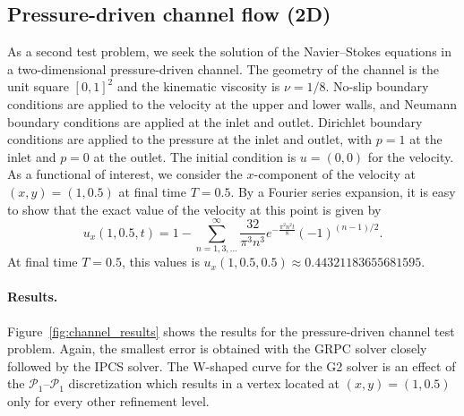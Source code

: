 \subsection{Pressure-driven channel flow (2D)}

As a second test problem, we seek the solution of the Navier--Stokes
equations in a two-dimensional pressure-driven channel. The geometry
of the channel is the unit square $[0, 1]^2$ and the kinematic
viscosity is $\nu = 1/8$. No-slip boundary conditions are applied to
the velocity at the upper and lower walls, and Neumann boundary
conditions are applied at the inlet and outlet. Dirichlet boundary
conditions are applied to the pressure at the inlet and outlet, with
$p = 1$ at the inlet and $p = 0$ at the outlet. The initial condition
is $u = (0, 0)$ for the velocity. As a functional of interest, we
consider the $x$-component of the velocity at $(x, y) = (1, 0.5)$ at
final time $T = 0.5$. By a Fourier series expansion, it is easy to
show that the exact value of the velocity at this point is given by
\begin{equation} \label{eq:exact_channel}
  u_x(1, 0.5, t) = 1 - \sum_{n=1,3,...}^\infty \frac{32}{\pi^3 n^3}
  e^{-\frac{\pi^2 n^2 t}{8}} (-1)^{(n-1)/2}.
\end{equation}
At final time $T=0.5$, this values is $u_x(1, 0.5, 0.5) \approx
0.44321183655681595$.

\paragraph{Results.}

Figure~\ref{fig:channel_results} shows the results for the
pressure-driven channel test problem. Again, the smallest error is
obtained with the GRPC solver closely followed by the IPCS solver.
The W-shaped curve for the G2 solver is an effect of the $\mathcal{P}_1$--$\mathcal{P}_1$
discretization which results in a vertex located at $(x, y) = (1,
0.5)$ only for every other refinement level.

